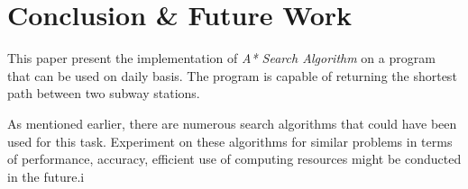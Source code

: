 \documentclass{IEEEtran}
\begin{document}
	
	\section{Conclusion \& Future Work}
	
	This paper present the implementation of \textit{A* Search Algorithm} on a program that can be used on daily basis. The program is capable of returning the shortest path between two subway stations. \newline
	
	As mentioned earlier, there are numerous search algorithms that could have been used for this task. Experiment on these algorithms for similar problems in terms of performance, accuracy, efficient use of computing resources might be conducted in the future.i
	
	
	
\end{document}
